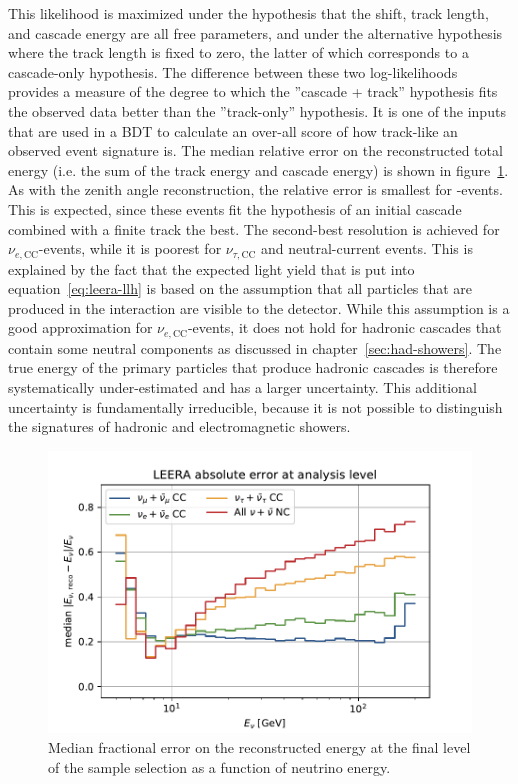 This likelihood is maximized under the hypothesis that the shift, track length, and cascade energy are all free parameters, and under the alternative hypothesis where the track length is fixed to zero, the latter of which corresponds to a cascade-only hypothesis. The difference between these two log-likelihoods provides a measure of the degree to which the ''cascade + track'' hypothesis fits the observed data better than the ''track-only'' hypothesis. It is one of the inputs that are used in a BDT to calculate an over-all score of how track-like an observed event signature is. The median relative error on the reconstructed total energy (i.e. the sum of the track energy and cascade energy) is shown in figure~\ref{fig:leera-resolution}. As with the zenith angle reconstruction, the relative error is smallest for \numucc-events. This is expected, since these events fit the hypothesis of an initial cascade combined with a finite track the best. The second-best resolution is achieved for $\nu_{e,\mathrm{CC}}$-events, while it is poorest for $\nu_{\tau,\mathrm{CC}}$ and neutral-current events. This is explained by the fact that the expected light yield that is put into equation~\ref{eq:leera-llh} is based on the assumption that all particles that are produced in the interaction are visible to the detector. While this assumption is a good approximation for $\nu_{e,\mathrm{CC}}$-events, it does not hold for hadronic cascades that contain some neutral components as discussed in chapter~\ref{sec:had-showers}. The true energy of the primary particles that produce hadronic cascades is therefore systematically under-estimated and has a larger uncertainty. This additional uncertainty is fundamentally irreducible, because it is not possible to distinguish the signatures of hadronic and electromagnetic showers.

\begin{figure}
    \centering
    \includegraphics[width=0.8\linewidth]{figures/icecube/reconstruction/leera/leera_absolute_error_final.pdf}
    \caption{Median fractional error on the reconstructed energy at the final level of the sample selection as a function of neutrino energy.}
    \label{fig:leera-resolution}
\end{figure}

